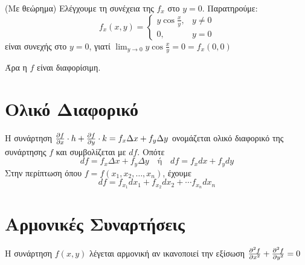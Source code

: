 \begin{examples}
\begin{enumerate}
\begin{solution}{(Με θεώρημα)}
                        Ελέγχουμε τη συνέχεια της $ f_{x} $ στο $ y=0 $. Παρατηρούμε:
                        \[
                            f_{x}(x,y) = \begin{cases} y \cos{\frac{x}{y}}, & y \neq 0 \\ 0, & y=0 \end{cases}  
                         \] 
                         είναι συνεχής στο $ y=0 $, γιατί $ \lim_{y \to 0} y \cos{\frac{x}{y}
                         } = 0 = f_{x}(0,0) $
                         
                         Άρα η $f$ είναι διαφορίσιμη.
                    \end{solution}
            \end{enumerate}
        \end{examples}

        \section{Ολικό Διαφορικό}

        \begin{dfn}
        \item {}
            Η συνάρτηση $ \pdv{f}{x}\cdot h + \pdv{f}{y} \cdot k = f_{x} \Delta x 
            + f_{y} \Delta y $ ονομάζεται ολικό διαφορικό της συνάρτησης $f$ και συμβολίζεται με $
            df $. Οπότε 
            \[
                df = f_{x} \Delta x + f_{y} \Delta y \quad \text{ή} \quad df = f_{x}dx + f_{y}dy 
             \] 
             Στην περίπτωση όπου $ f= f(x_{1}, x_{2}, \ldots, x_{n}) $, έχουμε
             \[
                 df = f_{x_{1}}d{x_{1}} + f_{x_{2}}d{x_{2}} + \cdots f_{x_{n}} dx_{n}
              \]

        \end{dfn}

        \section{Αρμονικές Συναρτήσεις}

        \begin{dfn}
            Η συνάρτηση $ f(x,y) $ λέγεται αρμονική αν ικανοποιεί την εξίσωση 
            $ \pdv[2]{f}{x} + \pdv[2]{f}{y} = 0 $ 
        \end{dfn}

